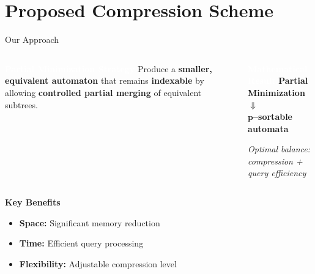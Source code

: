 \documentclass[aspectratio=169]{beamer}
\begin{document}

\section{Proposed Compression Scheme}
\begin{frame}{Our Approach}
	\begin{columns}[t]
		\begin{block}{\textcolor{white}{\textbf{Partial Minimization Strategy}}}
			Produce a \textcolor{oiGreen}{\textbf{smaller, equivalent automaton}} that remains \textcolor{oiBlue}{\textbf{indexable}} by allowing \textcolor{oiRed}{\textbf{controlled partial merging}} of equivalent subtrees.
		\end{block}

		\begin{block}{\textcolor{white}{\textbf{Mathematical Result}}}
			\centering
			\textbf{Partial Minimization} \\
			$\Downarrow$ \\
			\textbf{$\mathbf{p}$--sortable automata}

			\vspace{0.2cm}
			\textit{Optimal balance: compression + query efficiency}
		\end{block}
	\end{columns}
	\vspace{0.2cm}
	\textbf{\textcolor{oiBlue}{Key Benefits}}
	\begin{itemize}
		\item \textbf{Space:} Significant memory reduction
		\item \textbf{Time:} Efficient query processing
		\item \textbf{Flexibility:} Adjustable compression level
	\end{itemize}
\end{frame}

\end{document}
